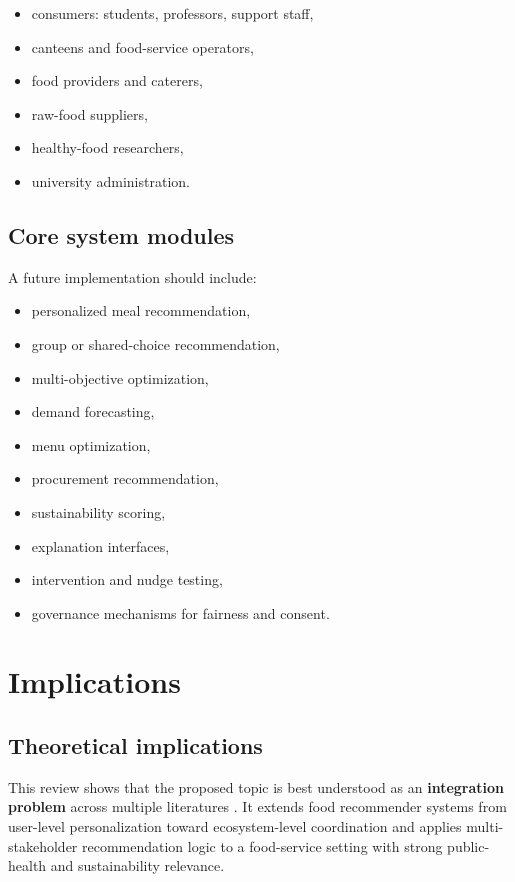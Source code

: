 \begin{itemize}
\tightlist
\item
  consumers: students, professors, support staff,
\item
  canteens and food-service operators,
\item
  food providers and caterers,
\item
  raw-food suppliers,
\item
  healthy-food researchers,
\item
  university administration.
\end{itemize}

\subsection{Core system modules}\label{core-system-modules}

A future implementation should include:

\begin{itemize}
\tightlist
\item
  personalized meal recommendation,
\item
  group or shared-choice recommendation,
\item
  multi-objective optimization,
\item
  demand forecasting,
\item
  menu optimization,
\item
  procurement recommendation,
\item
  sustainability scoring,
\item
  explanation interfaces,
\item
  intervention and nudge testing,
\item
  governance mechanisms for fairness and consent.
\end{itemize}

\section{Implications}\label{implications}

\subsection{Theoretical implications}\label{theoretical-implications}

This review shows that the proposed topic is best understood as an
\textbf{integration problem} across multiple literatures
\citep{bondevik2024, zheng2017msr, peixoto2026sustainability}. It
extends food recommender systems from user-level personalization toward
ecosystem-level coordination and applies multi-stakeholder
recommendation logic to a food-service setting with strong public-health
and sustainability relevance.


